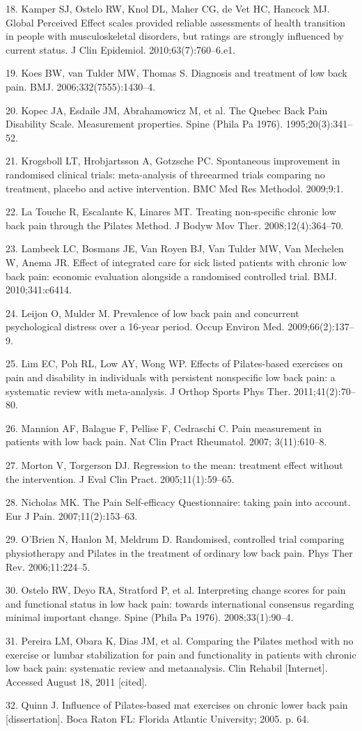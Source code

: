\documentclass[a5paper]{article}
\theoremstyle{definition}
\begin{document}
18. Kamper SJ, Ostelo RW, Knol DL, Maher CG, de Vet HC,
Hancock MJ. Global Perceived Effect scales provided reliable
assessments of health transition in people with musculoskeletal
disorders, but ratings are strongly influenced by current status.
J Clin Epidemiol. 2010;63(7):760–6.e1.

19. Koes BW, van Tulder MW, Thomas S. Diagnosis and treatment of
low back pain. BMJ. 2006;332(7555):1430–4.

20. Kopec JA, Esdaile JM, Abrahamowicz M, et al. The Quebec Back
Pain Disability Scale. Measurement properties. Spine (Phila Pa
1976). 1995;20(3):341–52.

21. Krogsboll LT, Hrobjartsson A, Gotzsche PC. Spontaneous improvement in randomised clinical trials: meta-analysis of threearmed trials comparing no treatment, placebo and active intervention. BMC Med Res Methodol. 2009;9:1.

22. La Touche R, Escalante K, Linares MT. Treating non-specific
chronic low back pain through the Pilates Method. J Bodyw Mov
Ther. 2008;12(4):364–70.

23. Lambeek LC, Bosmans JE, Van Royen BJ, Van Tulder MW,
Van Mechelen W, Anema JR. Effect of integrated care for sick
listed patients with chronic low back pain: economic evaluation
alongside a randomised controlled trial. BMJ. 2010;341:c6414.

24. Leijon O, Mulder M. Prevalence of low back pain and concurrent
psychological distress over a 16-year period. Occup Environ Med.
2009;66(2):137–9.

25. Lim EC, Poh RL, Low AY, Wong WP. Effects of Pilates-based
exercises on pain and disability in individuals with persistent
nonspecific low back pain: a systematic review with meta-analysis.
J Orthop Sports Phys Ther. 2011;41(2):70–80.

26. Mannion AF, Balague F, Pellise F, Cedraschi C. Pain measurement
in patients with low back pain. Nat Clin Pract Rheumatol. 2007;
3(11):610–8.

27. Morton V, Torgerson DJ. Regression to the mean: treatment effect
without the intervention. J Eval Clin Pract. 2005;11(1):59–65.

28. Nicholas MK. The Pain Self-efficacy Questionnaire: taking pain
into account. Eur J Pain. 2007;11(2):153–63.

29. O’Brien N, Hanlon M, Meldrum D. Randomised, controlled trial
comparing physiotherapy and Pilates in the treatment of ordinary
low back pain. Phys Ther Rev. 2006;11:224–5.

30. Ostelo RW, Deyo RA, Stratford P, et al. Interpreting change scores
for pain and functional status in low back pain: towards international consensus regarding minimal important change. Spine
(Phila Pa 1976). 2008;33(1):90–4.

31. Pereira LM, Obara K, Dias JM, et al. Comparing the Pilates method
with no exercise or lumbar stabilization for pain and functionality in
patients with chronic low back pain: systematic review and metaanalysis. Clin Rehabil [Internet]. Accessed August 18, 2011 [cited].

32. Quinn J. Influence of Pilates-based mat exercises on chronic lower
back pain [dissertation]. Boca Raton {FL}: Florida Atlantic University; 2005. p. 64.
\end{document}
